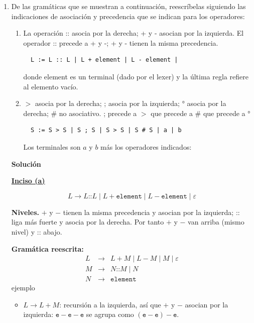\documentclass[12pt, letterpaper]{article}
\newcommand{\tk}[1]{\mathtt{#1}}
\newcommand{\occ}{\mathbin{\texttt{::}}}
\newenvironment{solucion}{\par\medskip\noindent\textbf{\large Solución}\par\smallskip}{\par\bigskip}
\begin{document}
\begin{enumerate}
\item De las gramáticas que se muestran a continuación, reescríbelas siguiendo las indicaciones de asociación y precedencia que se indican para los operadores:
  \begin{enumerate}[label=(\alph*)]
  \item La operación :: asocia por la derecha; + y - asocian por la izquierda. El operador :: precede a + y -; + y - tienen la misma precedencia.
\begin{verbatim}
  L := L :: L | L + element | L - element |
\end{verbatim}
donde element es un terminal (dado por el lexer) y la última regla refiere al elemento vacío.
\item $>$ asocia por la derecha; ; asocia por la izquierda; ° asocia por la derecha; $\#$ no asociativo. ; precede a $>$ que precede a $\#$ que precede a °
\begin{verbatim}
  S := S > S | S ; S | S > S | S # S | a | b
\end{verbatim}
Los terminales son $a$ y $b$ más los operadores indicados:
  \end{enumerate}

  \begin{solucion}


    \medskip\noindent\textbf{\underline{Inciso (a)}}

    \[
    L \to L \occ L \mid L + \tk{element} \mid L - \tk{element} \mid \varepsilon
    \]

    \textbf{Niveles.} $+$ y $-$ tienen la misma precedencia y asocian por la
    izquierda; $\occ$ liga más fuerte y asocia por la derecha. Por tanto $+$ y $-$
    van arriba (mismo nivel) y $\occ$ abajo.

    \textbf{Gramática reescrita:}
    \[
    \begin{array}{rcl}
      L &\to& L + M \mid L - M \mid M \mid \varepsilon \\
      M &\to& N \occ M \mid N \\
      N &\to& \tk{element}
    \end{array}
    \]
    ejemplo

    \begin{itemize}[leftmargin=*]
    \item $L \to L + M$: recursión a la izquierda, así que $+$ y $-$ asocian por
      la izquierda: $\tk{e} - \tk{e} - \tk{e}$ se agrupa como
      $(\tk{e} - \tk{e}) - \tk{e}$.
      

\end{itemize}
\end{solucion}
\end{enumerate}
\end{document}
